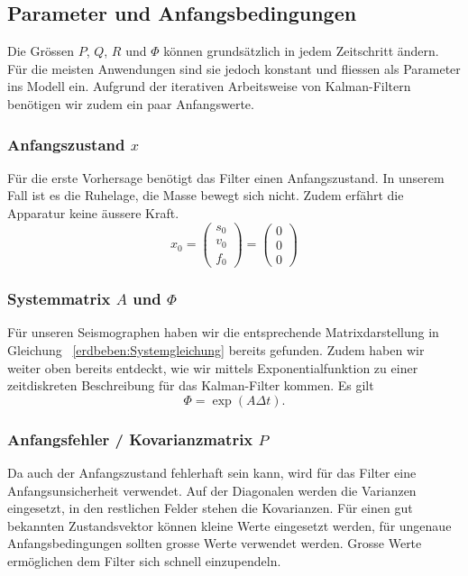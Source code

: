 \subsection{Parameter und Anfangsbedingungen}
Die Grössen $P$, $Q$, $R$ und $\Phi$ können grundsätzlich in jedem Zeitschritt ändern.
Für die meisten Anwendungen sind sie jedoch konstant und fliessen als Parameter ins Modell ein.
Aufgrund der iterativen Arbeitsweise von Kalman-Filtern benötigen wir zudem ein paar Anfangswerte.

\subsubsection*{Anfangszustand $x$}
Für die erste Vorhersage benötigt das Filter einen Anfangszustand.
In unserem Fall ist es die Ruhelage, die Masse bewegt sich nicht. 
Zudem erfährt die Apparatur keine äussere Kraft.
\[ {x_0 }= \left( \begin{array}{c} {s_0}\\ {v_0}\\{f_0}\end{array}\right) = \left( \begin{array}{c} 0\\ 0\\ 0\end{array}\right) \]

\subsubsection*{Systemmatrix $A$ und $\Phi$}
Für unseren Seismographen haben wir die entsprechende Matrixdarstellung in Gleichung ~\eqref{erdbeben:Systemgleichung} bereits gefunden.
Zudem haben wir weiter oben bereits entdeckt, wie wir mittels Exponentialfunktion zu einer zeitdiskreten Beschreibung für das Kalman-Filter kommen.
Es gilt
\[ \Phi = \exp(A \Delta t) .\]

\subsubsection*{Anfangsfehler / Kovarianzmatrix $P$}
Da auch der Anfangszustand fehlerhaft sein kann, wird für das Filter eine Anfangsunsicherheit verwendet. 
Auf der Diagonalen werden die Varianzen eingesetzt, in den restlichen Felder stehen die Kovarianzen.
Für einen gut bekannten Zustandsvektor können kleine Werte eingesetzt werden, für ungenaue Anfangsbedingungen sollten grosse Werte verwendet werden. 
Grosse Werte ermöglichen dem Filter sich schnell einzupendeln. 

